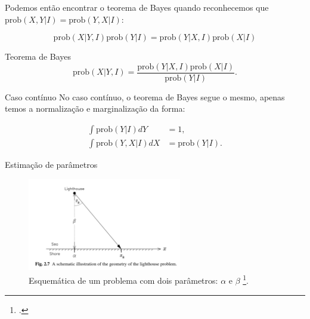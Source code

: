\documentclass[aspectratio=169,xcolor=dvipsnames]{beamer}
\newcommand{\prob}{\text{prob}}
\begin{document}
\begin{frame}
  Podemos então encontrar o teorema de Bayes quando reconhecemos que $\prob(X, Y | I) = \prob(Y, X | I)$:
  
  \begin{equation}
    \prob(X | Y, I) \prob(Y | I) = \prob(Y | X, I) \prob(X | I)
  \end{equation}

  \begin{block}{Teorema de Bayes}
  \begin{equation}
    \prob(X | Y, I) = \frac{\prob(Y | X, I) \prob(X | I)}{\prob(Y | I)}.
  \end{equation}
  \end{block}
\end{frame}

\begin{frame}{Caso contínuo}
  No caso contínuo, o teorema de Bayes segue o mesmo, apenas temos a normalização e marginalização da forma:
  
  \begin{equation}
  \begin{aligned}
    \int \prob(Y | I) dY &= 1, \\
    \int \prob(Y,X | I) dX &= \prob(Y | I).
  \end{aligned}
  \end{equation}
\end{frame}

\begin{frame}{Estimação de parâmetros}
  \begin{figure}
    \centering
    \includegraphics[width=0.6\textwidth]{farol.png}
    \caption{Esquemática de um problema com dois parâmetros: $\alpha$ e $\beta$ \footcite{Sivia_2006}.}
  \end{figure}
\end{frame}
\end{document}
